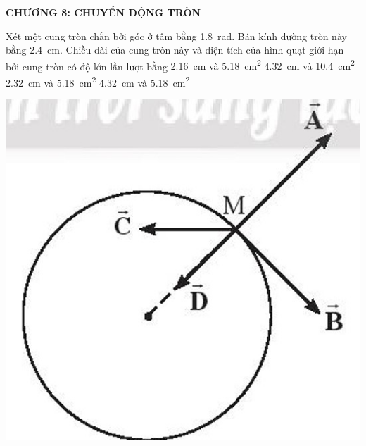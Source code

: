 \begin{center}
	\textbf{CHƯƠNG 8: CHUYỂN ĐỘNG TRÒN}
\end{center}

\begin{ex}
	Xét một cung tròn chắn bởi góc ở tâm bằng \SI{1.8}{\radian}. Bán kính đường tròn này bằng \SI{2.4}{\centi\meter}. Chiều dài của cung tròn này và diện tích của hình quạt giới hạn bởi cung tròn có độ lớn lần lượt bằng
	\choice
	{\SI{2.16}{\centi\meter} và \SI{5.18}{\centi\meter^2}}
	{\SI{4.32}{\centi\meter} và \SI{10.4}{\centi\meter^2}}
	{\SI{2.32}{\centi\meter} và \SI{5.18}{\centi\meter^2}}
	{\True\SI{4.32}{\centi\meter} và \SI{5.18}{\centi\meter^2}}
	\loigiai{}
\end{ex}
\begin{ex}
	{\includegraphics[scale=0.4]{figs/D10-CK2-001-1}}
	\loigiai{}
\end{ex}
